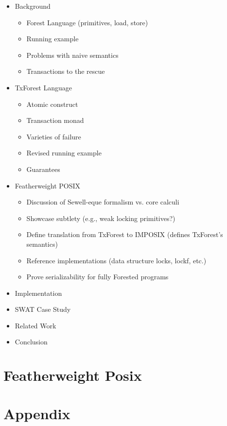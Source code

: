 \documentclass[nocopyrightspace]{sigplanconf}
\begin{document}
\begin{itemize}
\item Background
\begin{itemize}
\item Forest Language (primitives, load, store)
\item Running example 
\item Problems with naive semantics
\item Transactions to the rescue
\end{itemize}
\item TxForest Language
\begin{itemize}
\item Atomic construct 
\item Transaction monad
\item Varieties of failure
\item Revised running example
\item Guarantees
\end{itemize}
\item Featherweight POSIX
\begin{itemize}
\item Discussion of Sewell-eque formalism vs. core calculi  
\item Showcase subtlety (e.g., weak locking primitives?)
\item Define translation from TxForest to IMPOSIX (defines TxForest's semantics)
\item Reference implementations (data structure locks, lockf, etc.)
\item Prove serializability for fully Forested programs
\end{itemize}
\item Implementation
\item SWAT Case Study
\item Related Work
\item Conclusion
\end{itemize}





\section{Featherweight Posix}
\label{sec:posix}





 
 
\balance  


\section*{Appendix}
\label{sec:appendix}

\end{document}
